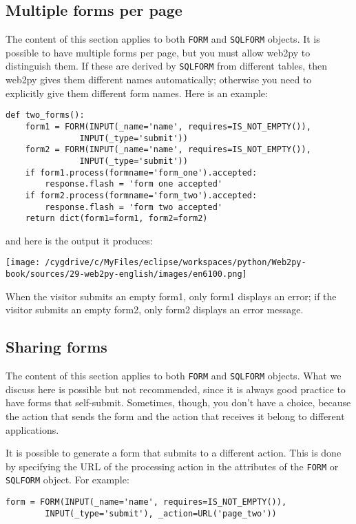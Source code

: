 \documentclass[justified,sixbynine,notoc]{tufte-book}
\def\ft{\small\tt}
\begin{document}
\begin{fullwidth}
\goodbreak\subsection{Multiple forms per page}

The content of this section applies to both {\ft FORM} and {\ft SQLFORM} objects.
It is possible to have multiple forms per page, but you must allow web2py to distinguish them. If these are derived by {\ft SQLFORM} from different tables, then web2py gives them different names automatically; otherwise you need to explicitly give them different form names. Here is an example:
\begin{lstlisting}
def two_forms():
    form1 = FORM(INPUT(_name='name', requires=IS_NOT_EMPTY()),
               INPUT(_type='submit'))
    form2 = FORM(INPUT(_name='name', requires=IS_NOT_EMPTY()),
               INPUT(_type='submit'))
    if form1.process(formname='form_one').accepted:
        response.flash = 'form one accepted'
    if form2.process(formname='form_two').accepted:
        response.flash = 'form two accepted'
    return dict(form1=form1, form2=form2)
\end{lstlisting}
\noindent and here is the output it produces:


\goodbreak\begin{center}\texttt{[image: /cygdrive/c/MyFiles/eclipse/workspaces/python/Web2py-book/sources/29-web2py-english/images/en6100.png]}\end{center}


When the visitor submits an empty form1, only form1 displays an error; if the visitor submits an empty form2, only form2 displays an error message.

\goodbreak\subsection{Sharing forms}

The content of this section applies to both {\ft FORM} and {\ft SQLFORM} objects. What we discuss here is possible but not recommended, since it is always good practice to have forms that self-submit. Sometimes, though, you don't have a choice, because the action that sends the form and the action that receives it belong to different applications.

It is possible to generate a form that submits to a different action. This is done by specifying the URL of the processing action in the attributes of the {\ft FORM} or {\ft SQLFORM} object. For example:
\begin{lstlisting}
form = FORM(INPUT(_name='name', requires=IS_NOT_EMPTY()),
        INPUT(_type='submit'), _action=URL('page_two'))


\end{lstlisting}
\end{fullwidth}
\end{document}
